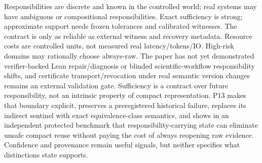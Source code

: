 \markdownRendererDocumentBegin
\markdownRendererSectionBegin
{}\markdownRendererInterblockSeparator
{}Responsibilities are discrete and known in the controlled world; real systems may have ambiguous or compositional responsibilities. Exact sufficiency is strong; approximate support needs frozen tolerances and calibrated witnesses. The contract is only as reliable as external witness and recovery metadata. Resource costs are controlled units, not measured real latency/tokens/IO. High-risk domains may rationally choose always-raw. The paper has not yet demonstrated verifier-backed Lean repair/diagnosis or blinded scientific-workflow responsibility shifts, and certificate transport/revocation under real semantic version changes remains an external validation gate.\markdownRendererInterblockSeparator
{}Sufficiency is a contract over future responsibility, not an intrinsic property of compact representation. P13 makes that boundary explicit, preserves a preregistered historical failure, replaces its indirect sentinel with exact equivalence-class semantics, and shows in an independent protected benchmark that responsibility-carrying state can eliminate unsafe compact reuse without paying the cost of always reopening raw evidence. Confidence and provenance remain useful signals, but neither specifies what distinctions state supports.\markdownRendererInterblockSeparator
{}
\markdownRendererSectionEnd \markdownRendererDocumentEnd